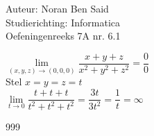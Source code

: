 \documentclass[a4paper]{article}
\begin{document}
  
\noindent \large Auteur: Noran Ben Said \\
\noindent \large Studierichting: Informatica\\
\noindent \large Oefeningenreeks 7A nr. 6.1\\

\medskip

\normalsize

$\lim\limits_{(x,y,z) \to (0,0,0)} \dfrac{x + y + z}{x^2 + y^2 + z^2} = \dfrac{0}{0}$ \\

Stel $x = y = z = t$ \\

$\lim\limits_{t \to 0} \dfrac{t + t + t}{t^2 + t^2 + t^2} = \dfrac{3t}{3t^2} = \dfrac{1}{t} = \infty$ \\


\begin{thebibliography}{999}
\end{thebibliography}
\end{document}
